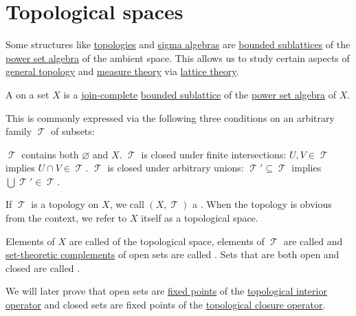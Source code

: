 \section{Topological spaces}\label{sec:topological_spaces}

\begin{remark}\label{rem:topologies_and_sigma_algebras_as_lattices}
  Some structures like \hyperref[def:topological_space]{topologies} and \hyperref[def:sigma_algebra]{sigma algebras} are \hyperref[def:lattice/subobject]{bounded sublattices} of the \hyperref[def:power_set_algebra]{power set algebra} of the ambient space. This allows us to study certain aspects of \hyperref[ch:general_topology]{general topology} and \hyperref[ch:measure_theory]{measure theory} via \hyperref[sec:lattices]{lattice theory}.
\end{remark}

\begin{definition}\label{def:topological_space}
  A  on a set \( X \) is a \hyperref[def:lattice]{join-complete} \hyperref[def:lattice/subobject]{bounded sublattice} of the \hyperref[def:power_set_algebra]{power set algebra} of \( X \).

  This is commonly expressed via the following three conditions on an arbitrary family \( \mscrT \) of subsets:
  \begin{thmenum}
     \( \mscrT \) contains both \( \varnothing \) and \( X \).
     \( \mscrT \) is closed under finite intersections: \( U, V \in \mscrT \) implies \( U \cap V \in \mscrT \).
     \( \mscrT \) is closed under arbitrary unions: \( \mscrT' \subseteq \mscrT \) implies \( \bigcup \mscrT' \in \mscrT \).
  \end{thmenum}

  If \( \mscrT \) is a topology on \( X \), we call \( (X, \mscrT) \) a . When the topology is obvious from the context, we refer to \( X \) itself as a topological space.

  Elements of \( X \) are called  of the topological space, elements of \( \mscrT \) are called  and \hyperref[def:power_set_algebra]{set-theoretic complements} of open sets are called . Sets that are both open and closed are called .
\end{definition}
\begin{comments}
  \item We will later prove that open sets are \hyperref[def:function_fixed_point]{fixed points} of the \hyperref[def:topological_interior_operator]{topological interior operator} and closed sets are fixed points of the \hyperref[def:topological_closure_operator]{topological closure operator}.
\end{comments}

